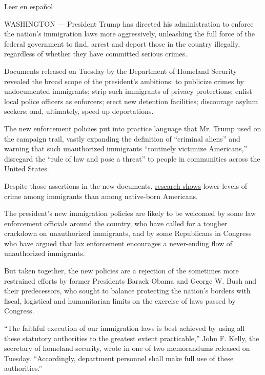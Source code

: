 \href{https://www.nytimes.com/es/2017/02/21/la-nuevas-politicas-migratorias-de-trump-permiten-mas-deportaciones/}{Leer
en español}

WASHINGTON --- President Trump has directed his administration to
enforce the nation's immigration laws more aggressively, unleashing the
full force of the federal government to find, arrest and deport those in
the country illegally, regardless of whether they have committed serious
crimes.

Documents released on Tuesday by the Department of Homeland Security
revealed the broad scope of the president's ambitions: to publicize
crimes by undocumented immigrants; strip such immigrants of privacy
protections; enlist local police officers as enforcers; erect new
detention facilities; discourage asylum seekers; and, ultimately, speed
up deportations.

The new enforcement policies put into practice language that Mr. Trump
used on the campaign trail, vastly expanding the definition of
``criminal aliens'' and warning that such unauthorized immigrants
``routinely victimize Americans,'' disregard the ``rule of law and pose
a threat'' to people in communities across the United States.

Despite those assertions in the new documents,
\href{https://www.americanimmigrationcouncil.org/research/criminalization-immigration-united-states}{research
shows} lower levels of crime among immigrants than among native-born
Americans.

The president's new immigration policies are likely to be welcomed by
some law enforcement officials around the country, who have called for a
tougher crackdown on unauthorized immigrants, and by some Republicans in
Congress who have argued that lax enforcement encourages a never-ending
flow of unauthorized immigrants.

But taken together, the new policies are a rejection of the sometimes
more restrained efforts by former Presidents Barack Obama and George W.
Bush and their predecessors, who sought to balance protecting the
nation's borders with fiscal, logistical and humanitarian limits on the
exercise of laws passed by Congress.

``The faithful execution of our immigration laws is best achieved by
using all these statutory authorities to the greatest extent
practicable,'' John F. Kelly, the secretary of homeland security, wrote
in one of two memorandums released on Tuesday. ``Accordingly, department
personnel shall make full use of these authorities.''


